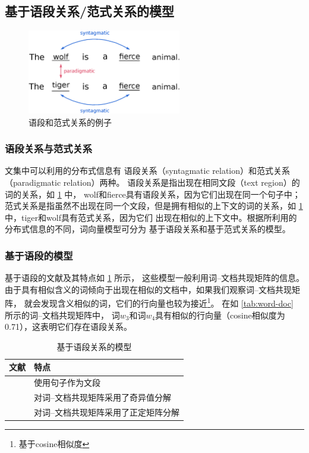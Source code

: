 \subsection{基于语段关系/范式关系的模型}
\label{subsec:syntag-paradig}

\begin{figure}
  \includegraphics[width=0.6\textwidth]{figures/syntagmatic-model.eps}
  \centering
  \caption{语段和范式关系的例子\cite{pmlr-v22-bordes12}}
  \label{fig:syntagmatic-model}
\end{figure}

\subsubsection{语段关系与范式关系}
文集中可以利用的分布式信息有
语段关系（syntagmatic relation）和范式关系（paradigmatic
relation）两种\cite{Sahlgren2008}。
语段关系是指出现在相同文段（text region）的词的关系，如 \cref{fig:syntagmatic-model} 中，
wolf和fierce具有语段关系，因为它们出现在同一个句子中；
范式关系是指虽然不出现在同一个文段，但是拥有相似的上下文的词的关系，如
\cref{fig:syntagmatic-model} 中，tiger和wolf具有范式关系，因为它们
出现在相似的上下文中。根据所利用的分布式信息的不同，词向量模型可分为
基于语段关系和基于范式关系的模型。

\subsubsection{基于语段的模型}
基于语段的文献及其特点如 \cref{tab:syntag-models} 所示，
这些模型一般利用词--文档共现矩阵的信息。
由于具有相似含义的词倾向于出现在相似的文档中，如果我们观察词--文档共现矩阵，
就会发现含义相似的词，它们的行向量也较为接近\footnote{基于cosine相似度}。
在如 \cref{tab:word-doc} 所示的词--文档共现矩阵中，
词$w_3$和词$w_4$具有相似的行向量（cosine相似度为0.71），这表明它们存在语段关系。

\begin{table}
  \centering
  \caption{基于语段关系的模型}
  \label{tab:syntag-models}
  \begin{tabular}{ll}
    \toprule
    文献 & 特点 \\
    \midrule
    \cite{doi:10.1080/01690969108406936}
    \cite{DBLP:journals/cacm/RubensteinG65} & 使用句子作为文段 \\
    \cite{DBLP:journals/jasis/DeerwesterDLFH90} & 对词--文档共现矩阵采用了奇异值分解 \\
    \cite{lee99} & 对词--文档共现矩阵采用了正定矩阵分解 \\
    \bottomrule
  \end{tabular}
\end{table}

